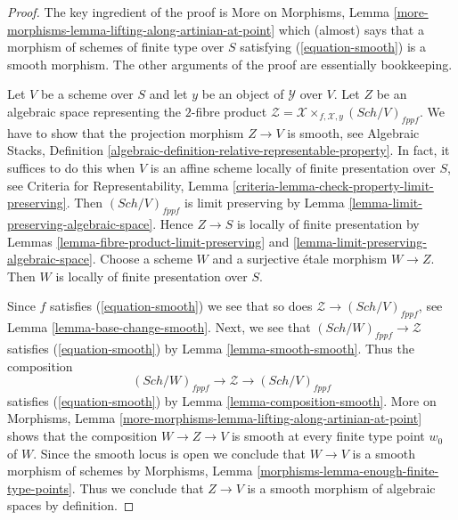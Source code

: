 \documentclass[10pt,a4paper]{amsart}
\theoremstyle{plain}
\theoremstyle{definition}
\theoremstyle{remark}
\numberwithin{equation}{subsection}
\def\Sch{\mathit{Sch}}
\begin{document}
\begin{proof}
The key ingredient of the proof is More on Morphisms, Lemma
\ref{more-morphisms-lemma-lifting-along-artinian-at-point}
which (almost) says that a morphism of schemes of finite type over $S$
satisfying (\ref{equation-smooth}) is a smooth morphism. The other
arguments of the proof are essentially bookkeeping.

\medskip\noindent
Let $V$ be a scheme over $S$ and let $y$ be an object of $\mathcal{Y}$ over
$V$. Let $Z$ be an algebraic space representing the $2$-fibre product
$\mathcal{Z} = \mathcal{X} \times_{f, \mathcal{X}, y} (\Sch/V)_{fppf}$.
We have to show that the projection morphism $Z \to V$ is smooth, see
Algebraic Stacks, Definition
\ref{algebraic-definition-relative-representable-property}.
In fact, it suffices to do this when $V$ is an affine scheme
locally of finite presentation over $S$, see
Criteria for Representability, Lemma
\ref{criteria-lemma-check-property-limit-preserving}.
Then $(\Sch/V)_{fppf}$ is limit preserving by
Lemma \ref{lemma-limit-preserving-algebraic-space}.
Hence $Z \to S$ is locally of finite presentation by
Lemmas \ref{lemma-fibre-product-limit-preserving} and
\ref{lemma-limit-preserving-algebraic-space}.
Choose a scheme $W$ and a surjective \'etale morphism $W \to Z$.
Then $W$ is locally of finite presentation over $S$.

\medskip\noindent
Since $f$ satisfies (\ref{equation-smooth}) we see that so does
$\mathcal{Z} \to (\Sch/V)_{fppf}$, see Lemma \ref{lemma-base-change-smooth}.
Next, we see that $(\Sch/W)_{fppf} \to \mathcal{Z}$ satisfies
(\ref{equation-smooth}) by Lemma \ref{lemma-smooth-smooth}.
Thus the composition
$$
(\Sch/W)_{fppf} \to \mathcal{Z} \to (\Sch/V)_{fppf}
$$
satisfies (\ref{equation-smooth}) by Lemma \ref{lemma-composition-smooth}.
More on Morphisms, Lemma
\ref{more-morphisms-lemma-lifting-along-artinian-at-point}
shows that the composition $W \to Z \to V$ is smooth at every finite type
point $w_0$ of $W$. Since the smooth locus is open we conclude
that $W \to V$ is a smooth morphism of schemes by
Morphisms, Lemma \ref{morphisms-lemma-enough-finite-type-points}.
Thus we conclude that $Z \to V$ is a smooth morphism
of algebraic spaces by definition.
\end{proof}
\end{document}
